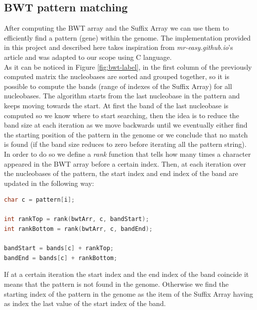 \documentclass[final,5p,times,twocolumn,authoryear]{elsarticle}
\begin{document}
\subsection{BWT pattern matching}
After computing the BWT array and the Suffix Array we can use them to efficiently find a pattern (gene) within the genome. The implementation provided in this project\cite{bwt.h me} and described here takes inspiration from \emph{mr-easy.github.io}'s article\cite{mreasy} and was adapted to our scope using C language.\\
As it can be noticed in Figure \ref{fig:bwt-label}, in the first column of the previously computed matrix the nucleobases are sorted and grouped together, so it is possible to compute the bands (range of indexes of the Suffix Array) for all nucleobases. The algorithm starts from the last nucleobase in the pattern and keeps moving towards the start. At first the band of the last nucleobase is computed so we know where to start searching, then the idea is to reduce the band size at each iteration as we move backwards until we eventually either find the starting position of the pattern in the genome or we conclude that no match is found (if the band size reduces to zero before iterating all the pattern string). In order to do so we define a \emph{rank} function that tells how many times a character appeared in the BWT array before a certain index. Then, at each iteration over the nucleobases of the pattern, the start index and end index of the band are updated in the following way:
\begin{lstlisting}[language=c++]
char c = pattern[i];

int rankTop = rank(bwtArr, c, bandStart);
int rankBottom = rank(bwtArr, c, bandEnd);

bandStart = bands[c] + rankTop;
bandEnd = bands[c] + rankBottom;
\end{lstlisting}
If at a certain iteration the start index and the end index of the band coincide it means that the pattern is not found in the genome. Otherwise we find the starting index of the pattern in the genome as the item of the Suffix Array having as index the last value of the start index of the band. 
\end{document}
